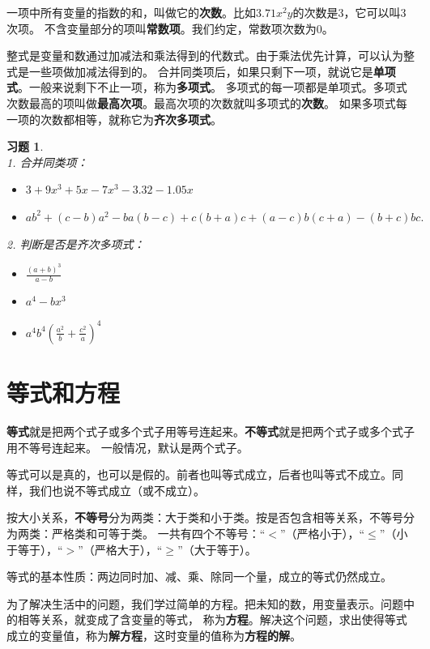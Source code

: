 \documentclass[12pt,UTF8]{ctexbook}
\theoremstyle{definition}
\theoremstyle{plain}
\newtheorem{xt}{习题}[section]
\begin{document}
一项中所有变量的指数的和，叫做它的\textbf{次数}。比如$3.71x^2y$的次数是$3$，它可以叫$3$次项。
不含变量部分的项叫\textbf{常数项}。我们约定，常数项次数为$0$。

整式是变量和数通过加减法和乘法得到的代数式。由于乘法优先计算，可以认为整式是一些项做加减法得到的。
合并同类项后，如果只剩下一项，就说它是\textbf{单项式}。一般来说剩下不止一项，称为\textbf{多项式}。
多项式的每一项都是单项式。多项式次数最高的项叫做\textbf{最高次项}。最高次项的次数就叫多项式的\textbf{次数}。
如果多项式每一项的次数都相等，就称它为\textbf{齐次多项式}。

\begin{xt}\label{xt:1-1-0}
    \mbox{} \\
    1. 合并同类项：\begin{itemize}
        \item $3 + 9x^3 + 5x - 7x^3 - 3.32 - 1.05x$
        \item $ab^2 + (c-b)a^2 - ba(b - c) + c(b + a)c + (a - c)b(c + a) - (b + c)bc.$
    \end{itemize}
    2. 判断是否是齐次多项式：\begin{itemize}
        \item $\frac{(a+b)^3}{a - b}$
        \item $a^4 - bx^3$
        \item $a^4b^4\left(\frac{a^2}{b} + \frac{c^2}{a}\right)^4$
    \end{itemize}
\end{xt}

\section{等式和方程}
\textbf{等式}就是把两个式子或多个式子用等号连起来。\textbf{不等式}就是把两个式子或多个式子用不等号连起来。
一般情况，默认是两个式子。

等式可以是真的，也可以是假的。前者也叫等式成立，后者也叫等式不成立。同样，我们也说不等式成立（或不成立）。

按大小关系，\textbf{不等号}分为两类：大于类和小于类。按是否包含相等关系，不等号分为两类：严格类和可等于类。
一共有四个不等号：“$<$”（严格小于），“$\leqslant$”（小于等于），“$>$”（严格大于），“$\geqslant$”（大于等于）。

等式的基本性质：两边同时加、减、乘、除同一个量，成立的等式仍然成立。

为了解决生活中的问题，我们学过简单的方程。把未知的数，用变量表示。问题中的相等关系，就变成了含变量的等式，
称为\textbf{方程}。解决这个问题，求出使得等式成立的变量值，称为\textbf{解方程}，这时变量的值称为\textbf{方程的解}。
\end{document}
